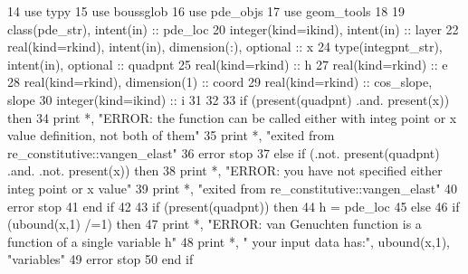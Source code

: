 \begin{DoxyCode}
14         \textcolor{keywordtype}{use }typy
15         \textcolor{keywordtype}{use }boussglob
16         \textcolor{keywordtype}{use }pde_objs
17         \textcolor{keywordtype}{use }geom_tools
18 
19         \textcolor{keywordtype}{class}(pde_str), \textcolor{keywordtype}{intent(in)} :: pde\_loc 
20         \textcolor{keywordtype}{integer(kind=ikind)}, \textcolor{keywordtype}{intent(in)} :: layer
22         \textcolor{keywordtype}{real(kind=rkind)}, \textcolor{keywordtype}{intent(in)}, \textcolor{keywordtype}{dimension(:)},  \textcolor{keywordtype}{optional} :: x
24         \textcolor{keywordtype}{type}(integpnt_str), \textcolor{keywordtype}{intent(in)}, \textcolor{keywordtype}{optional} :: quadpnt
25         \textcolor{keywordtype}{real(kind=rkind)} :: h
27         \textcolor{keywordtype}{real(kind=rkind)} :: e
28         \textcolor{keywordtype}{real(kind=rkind)}, \textcolor{keywordtype}{dimension(1)} :: coord
29         \textcolor{keywordtype}{real(kind=rkind)} :: cos\_slope, slope
30         \textcolor{keywordtype}{integer(kind=ikind)} :: i
31 
32         
33         \textcolor{keywordflow}{if} (\textcolor{keyword}{present}(quadpnt) .and. \textcolor{keyword}{present}(x)) \textcolor{keywordflow}{then}
34           print *, \textcolor{stringliteral}{"ERROR: the function can be called either with integ point or x value definition, not
       both of them"}
35           print *, \textcolor{stringliteral}{"exited from re\_constitutive::vangen\_elast"}
36           error stop
37         \textcolor{keywordflow}{else} \textcolor{keywordflow}{if} (.not. \textcolor{keyword}{present}(quadpnt) .and. .not. \textcolor{keyword}{present}(x)) \textcolor{keywordflow}{then}
38           print *, \textcolor{stringliteral}{"ERROR: you have not specified either integ point or x value"}
39           print *, \textcolor{stringliteral}{"exited from re\_constitutive::vangen\_elast"}
40           error stop
41 \textcolor{keywordflow}{        end if}
42         
43         \textcolor{keywordflow}{if} (\textcolor{keyword}{present}(quadpnt)) \textcolor{keywordflow}{then}
44           h = pde\_loc%
45         \textcolor{keywordflow}{else}
46           \textcolor{keywordflow}{if} (ubound(x,1) /=1) \textcolor{keywordflow}{then}
47             print *, \textcolor{stringliteral}{"ERROR: van Genuchten function is a function of a single variable h"}
48             print *, \textcolor{stringliteral}{"       your input data has:"}, ubound(x,1), \textcolor{stringliteral}{"variables"}
49             error stop
50 \textcolor{keywordflow}{          end if}

\end{DoxyCode}
